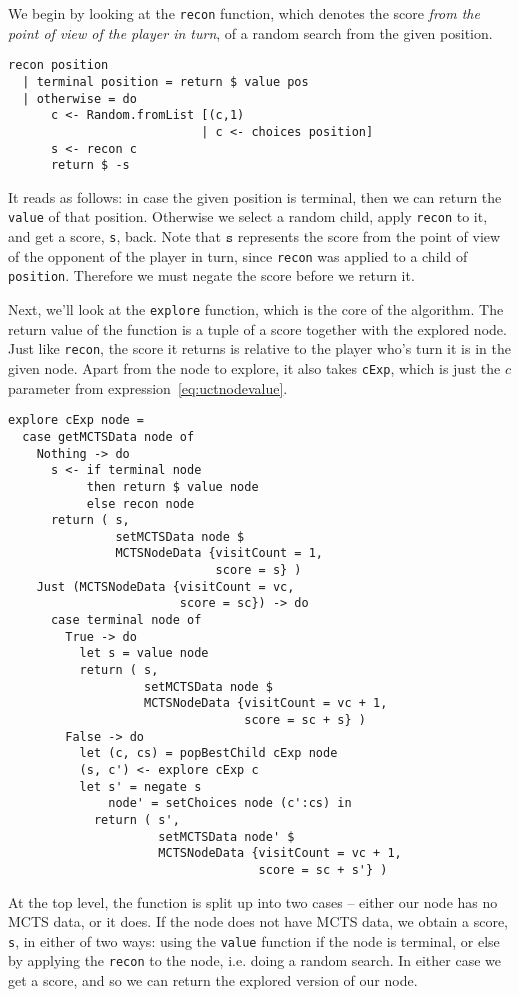 We begin by looking at the \texttt{recon} function, which denotes the score \emph{from the point of view of the player in turn}, of a random search from the given position.
\begin{minipage}{\linewidth}
\begin{lstlisting}[frame=single]
recon position
  | terminal position = return $ value pos
  | otherwise = do
      c <- Random.fromList [(c,1)
                           | c <- choices position]
      s <- recon c
      return $ -s
\end{lstlisting}
\end{minipage}
It reads as follows: in case the given position is terminal, then we can return the \texttt{value} of that position. Otherwise we select a random child, apply \texttt{recon} to it, and get a score, \texttt{s}, back.
Note that $\texttt{s}$ represents the score from the point of view of the opponent of the player in turn, since \texttt{recon} was applied to a child of \texttt{position}. Therefore we must negate the score before we return it.

Next, we'll look at the \texttt{explore} function, which is the core of the algorithm. The return value of the function is a tuple of a score together with the explored node. Just like \texttt{recon}, the score it returns is relative to the player who's turn it is in the given node. Apart from the node to explore, it also takes \texttt{cExp}, which is just the $c$ parameter from expression~\eqref{eq:uctnodevalue}.

\begin{minipage}{\linewidth}
\begin{lstlisting}[frame=single]
explore cExp node = 
  case getMCTSData node of
    Nothing -> do
      s <- if terminal node
           then return $ value node
           else recon node
      return ( s,
               setMCTSData node $
               MCTSNodeData {visitCount = 1,
                             score = s} )
    Just (MCTSNodeData {visitCount = vc,
                        score = sc}) -> do
      case terminal node of
        True -> do
          let s = value node
          return ( s,
                   setMCTSData node $
                   MCTSNodeData {visitCount = vc + 1,
                                 score = sc + s} )
        False -> do
          let (c, cs) = popBestChild cExp node
          (s, c') <- explore cExp c
          let s' = negate s
              node' = setChoices node (c':cs) in
            return ( s',
                     setMCTSData node' $
                     MCTSNodeData {visitCount = vc + 1,
                                   score = sc + s'} )
\end{lstlisting}
\end{minipage}
At the top level, the function is split up into two cases -- either our node has no MCTS data, or it does.
If the node does not have MCTS data, we obtain a score, \texttt{s}, in either of two ways: using the \texttt{value} function if the node is terminal, or else by applying the \texttt{recon} to the node, i.e. doing a random search.
In either case we get a score, and so we can return the explored version of our node.

